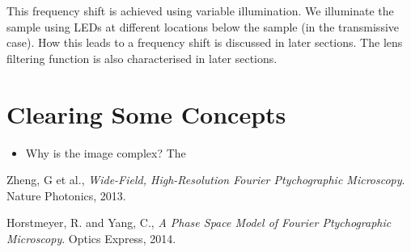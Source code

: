 \documentclass[11pt,a4paper,journal]{IEEEtran}
\begin{document}
This frequency shift is achieved using variable illumination. We illuminate the sample using LEDs at different locations below the sample (in the transmissive case). How this leads to a frequency shift is discussed in later sections. The lens filtering function is also characterised in later sections.

\section{Clearing Some Concepts}
\begin{itemize}
\item Why is the image complex? The
\end{itemize}

\begin{thebibliography}{10}

  Zheng, G et al.,
  \emph{Wide-Field, High-Resolution Fourier Ptychographic Microscopy}.
  Nature Photonics,
  2013.
  
  Horstmeyer, R. and Yang, C.,
  \emph{A Phase Space Model of Fourier Ptychographic Microscopy}.
  Optics Express,
  2014.
  
\end{thebibliography}
\end{document}
